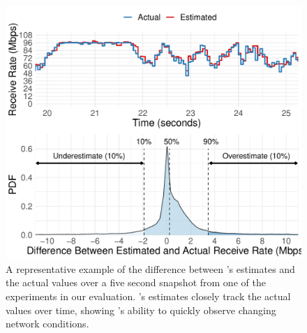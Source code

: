 \begin{figure}
    \centering
\begin{knitrout}
\color{fgcolor}
\includegraphics[width=\maxwidth]{figure/micro:time-thru-1} 

\end{knitrout}

    \caption{A representative example of the difference between \name's estimates and the actual values over a five second snapshot from one of the experiments in our evaluation. \name's estimates closely track the actual values over time, showing \name's ability to quickly observe changing network conditions.}
    \label{fig:micro:time-thru}
\end{figure}
